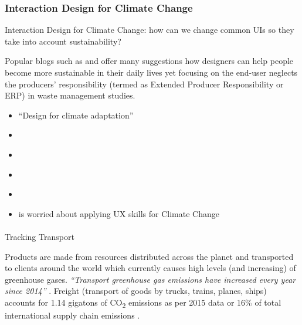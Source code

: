 \documentclass[
  letterpaper,
  DIV=11,
  numbers=noendperiod]{scrartcl}
\makeatletter
\let\oldparagraph\paragraph
\renewcommand{\paragraph}{
    \@ifstar
      \xxxParagraphStar
      \xxxParagraphNoStar
  }
\newcommand{\xxxParagraphStar}[1]{\oldparagraph*{#1}\mbox{}}
\newcommand{\xxxParagraphNoStar}[1]{\oldparagraph{#1}\mbox{}}
\providecommand{\tightlist}{%
  \setlength{\itemsep}{0pt}\setlength{\parskip}{0pt}}\usepackage{longtable,booktabs,array}
\makeatother
\begin{document}
\subsubsection{Interaction Design for Climate
Change}\label{interaction-design-for-climate-change}

Interaction Design for Climate Change: how can we change common UIs so
they take into account sustainability?

Popular blogs such as \citep{kohliHowDesignersCan2019} and
\citep{loseWaysUXDesign2023} offer many suggestions how designers can
help people become more sustainable in their daily lives yet focusing on
the end-user neglects the producers' responsibility (termed as Extended
Producer Responsibility or ERP) in waste management studies.

\begin{itemize}
\tightlist
\item
  \citet{uiaworldcongressofarchitectsDesignClimateAdaptation2023}
  ``Design for climate adaptation''
\item
  \citet{andrewchaissonHowFightClimate2019}
\item
  \citet{dzigajevHowCanWe2019}
\item
  \citet{mankoffEnvironmentalSustainabilityInteraction2007}
\item
  \citet{borthwickHumancentredLifecentredDesign2022}
\item
  \citet{loseUsingMySkills2023} is worried about applying UX skills for
  Climate Change
\end{itemize}

\paragraph{Tracking Transport}\label{tracking-transport}

Products are made from resources distributed across the planet and
transported to clients around the world which currently causes high
levels (and increasing) of greenhouse gases. \emph{``Transport
greenhouse gas emissions have increased every year since 2014''}
\citep{ClimateChangeMitigation2023}. Freight (transport of goods by
trucks, trains, planes, ships) accounts for 1.14 gigatons of
CO\textsubscript{2} emissions as per 2015 data or 16\% of total
international supply chain emissions
\citep{wangVolumeTradeinducedCrossborder2022}.
\end{document}
